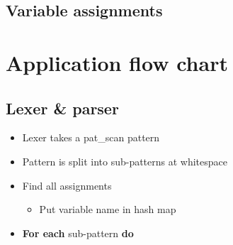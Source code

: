 \documentclass[12pt]{article}
\begin{document}
\subsection{Variable assignments}



\section{Application flow chart}

\subsection{Lexer \& parser}

\begin{itemize}
	\item Lexer takes a pat\_scan pattern
	\item Pattern is split into sub-patterns at whitespace
	\item Find all assignments
	\begin{itemize}
		\item Put variable name in hash map
	\end{itemize}
	\item \textbf{For each} sub-pattern \textbf{do}
\end{itemize}



\newpage


\nocite{*}

\end{document}
